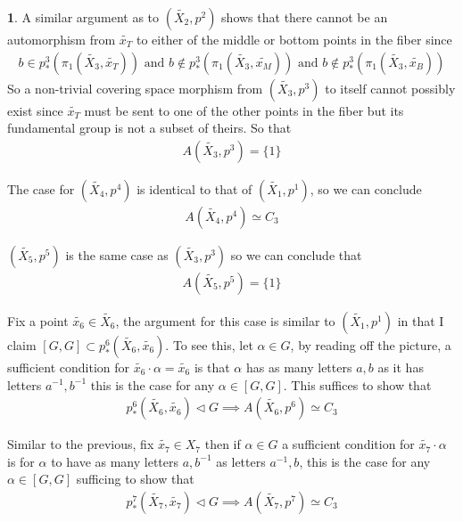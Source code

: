 \documentclass[10.5pt]{article}
\theoremstyle{definition}
\newtheorem{pb}{}
\newcommand{\set}[1]{\{#1\}}
\newcommand{\tand}{\text{ and }}
\begin{document}
\begin{pb}
        A similar argument as to \((\tilde{X_2},p^2)\) shows that there cannot be an automorphism from \(\tilde{x_T}\) to either of the middle or bottom points in the fiber since
        \begin{align*}
            b \in p^3_*(\pi_1(\tilde{X_3},\tilde{x_T})) \tand b \not \in p^3_*(\pi_1(\tilde{X_3},\tilde{x_M})) \tand b \not \in p^3_*(\pi_1(\tilde{X_3},\tilde{x_B}))
        \end{align*}
        So a non-trivial covering space morphism from \((\tilde{X_3},p^3)\) to itself cannot possibly exist since \(\tilde{x_T}\) must be sent to one of the other points in the fiber but its fundamental group is not a subset of theirs. So that
        \begin{align*}
            A(\tilde{X_3},p^3) = \set{1}
        \end{align*}
        
        The case for \((\tilde{X_4},p^4)\) is identical to that of \((\tilde{X_1},p^1)\), so we can conclude
        \begin{align*}
           A(\tilde{X_4},p^4) \simeq C_3
        \end{align*}

        \((\tilde{X_5},p^5)\) is the same case as \((\tilde{X_3},p^3)\) so we can conclude that
        \begin{align*}
            A(\tilde{X_5},p^5) = \set{1}
        \end{align*}

        Fix a point \(\tilde{x_6} \in \tilde{X_6}\), the argument for this case is similar to \((\tilde{X_1},p^1)\) in that I claim \([G,G] \subset p^6_*(\tilde{X_6},\tilde{x_6})\).
        To see this, let \(\alpha \in G\), by reading off the picture, a sufficient condition for \(\tilde{x_6}\cdot \alpha = \tilde{x_6}\) is that \(\alpha\) has as many letters \(a,b\) as it has letters \(a^{-1},b^{-1}\) this is the case for any \(\alpha \in [G,G]\). This suffices to show that
        \begin{align*}
            p^6_*(\tilde{X_6},\tilde{x_6}) \lhd G \implies A(\tilde{X_6},p^6) \simeq C_3
        \end{align*}

        Similar to the previous, fix \(\tilde{x_7} \in X_7\) then if \(\alpha \in G\) a sufficient condition for \(\tilde{x_7}\cdot \alpha\) is for \(\alpha\) to have as many letters \(a,b^{-1}\) as letters \(a^{-1},b\), this is the case for any \(\alpha \in [G,G]\) sufficing to show that
        \begin{align*}
            p^7_*(\tilde{X_7},\tilde{x_7}) \lhd G \implies A(\tilde{X_7},p^7) \simeq C_3
        \end{align*}


\end{pb}
\end{document}
